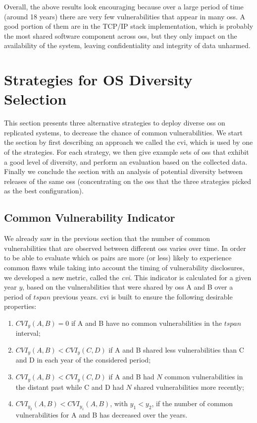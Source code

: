 Overall, the above results look encouraging because over a large period of time (around 18 years) there are very few vulnerabilities that appear in many \glspl{os}. 
A good portion of them are in the TCP/IP stack implementation, which is probably the most shared software component across \glspl{os}, but they only impact on the availability of the system, leaving confidentiality and integrity of data unharmed.



\section{Strategies for OS Diversity Selection}\label{evaluation}

This section presents three alternative strategies to deploy diverse \glspl{os} on replicated systems, to decrease the chance of common vulnerabilities. 
We start the section by first describing an approach we called the \gls{cvi}, which is used by one of the strategies. 
For each strategy, we then give example sets of \glspl{os} that exhibit a good level of diversity, and perform an evaluation based on the collected data. 
Finally we conclude the section with an analysis of potential diversity between releases of the same \glspl{os} (concentrating on the \glspl{os} that the three strategies picked as the best configuration).

\subsection*{Common Vulnerability Indicator}\label{cvi}

We already saw in the previous section that the number of common vulnerabilities that are observed between different \glspl{os} varies over time. 
In order to be able to evaluate which \gls{os} pairs are more (or less) likely to experience common flaws while taking into account the timing of vulnerability disclosures, we developed a new metric, called the \emph{\gls{cvi}}. 
This indicator is calculated for a given year $y$, based on the vulnerabilities that were shared by \glspl{os} A and B over a period of $\mathit{tspan}$ previous years. \gls{cvi} is built to ensure the following desirable properties:
\begin{enumerate}
\newcommand{\OLDtheenumi}{\theenumi}
\renewcommand{\theenumi}{\roman{enumi}}
\item $\mathit{CVI}_y(A,B) = 0$ if A and B have no common vulnerabilities in the $\mathit{tspan}$ interval;
\item $\mathit{CVI}_y(A,B) < \mathit{CVI}_y(C,D)$ if A and B shared less vulnerabilities than C and D in each year of the considered period;
\item $\mathit{CVI}_y(A,B) < \mathit{CVI}_y(C,D)$ if A and B had $N$ common vulnerabilities in the distant past while C and D had $N$ shared vulnerabilities more recently;
\item $\mathit{CVI}_{y_2}(A,B) < \mathit{CVI}_{y_1}(A,B)$, with $y_1 < y_2$, if the number of common vulnerabilities for A and B has decreased over the years.
\renewcommand{\theenumi}{\OLDtheenumi}
\end{enumerate}

